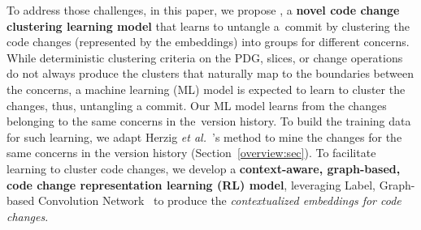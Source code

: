 




To address those challenges, in this paper, we propose {\bf \tool}, a
{\bf novel code change clustering learning model} that learns to
untangle a~commit by clustering the code changes (represented by the
embeddings) into groups for different concerns.
%
While deterministic clustering criteria on the PDG, slices, or change
operations do not always produce the clusters that naturally map to
the boundaries between the concerns, a machine learning (ML) model is
expected to learn to cluster the changes, thus, untangling a
commit. Our ML model learns from the changes belonging to the same
concerns in the~version history. To build the training data for such
learning, we adapt Herzig {\em et al.}~\cite{kim-emse16}'s method to
mine the changes for the same concerns in the version history
(Section~\ref{overview:sec}).
%
To facilitate learning to cluster code changes, we develop a {\bf
  context-aware, graph-based, code change representation learning (RL)
  model}, leveraging
Label, Graph-based Convolution Network~\cite{label-gcn} to produce the
{\em contextualized embeddings for code changes}.


